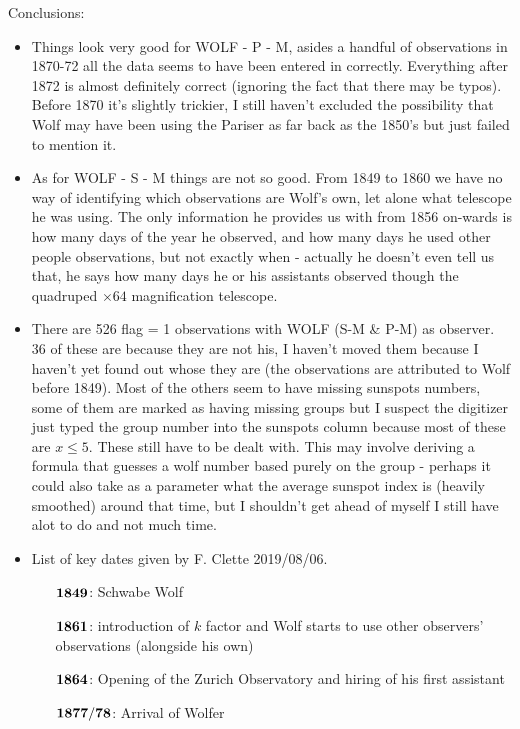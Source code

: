 \documentclass[12pt]{article}
\begin{document}
Conclusions:
\begin{itemize}
    \item Things look very good for WOLF - P - M, asides a handful of observations in 1870-72 all the data seems to have been entered in correctly. Everything after 1872 is almost definitely correct (ignoring the fact that there may be typos). Before 1870 it's slightly trickier, I still haven't excluded the possibility that Wolf may have been using the Pariser as far back as the 1850's but just failed to mention it. 
    \item As for WOLF - S - M things are not so good. From 1849 to 1860 we have no way of identifying which observations are Wolf's own, let alone what telescope he was using. The only information he provides us with from 1856 on-wards is how many days of the year he observed, and how many days he used other people observations, but not exactly when - actually he doesn't even tell us that, he says how many days he or his assistants observed though the quadruped $\times 64$ magnification telescope.
    \item There are 526 flag = 1 observations with WOLF (S-M \& P-M) as observer. 36 of these are because they are not his, I haven't moved them because I haven't yet found out whose they are (the observations are attributed to Wolf before 1849). Most of the others seem to have missing sunspots numbers, some of them are marked as having missing groups but I suspect the digitizer just typed the group number into the sunspots column because most of these are $x\leq 5$. These still have to be dealt with. This may involve deriving a formula that guesses a wolf number based purely on the group - perhaps it could also take as a parameter what the average sunspot index is (heavily smoothed) around that time, but I shouldn't get ahead of myself I still have alot to do and not much time.
       \item List of key dates given by F. Clette 2019/08/06.
    \begin{itemize}
        \item[$\bold{1849}$:] Schwabe Wolf
        \item[$\bold{1861}$:] introduction of $k$ factor and Wolf starts to use other observers' observations (alongside his own)
        \item[$\bold{1864}$:] Opening of the Zurich Observatory and hiring of his first assistant
        \item[$\bold{1877 / 78}$:] Arrival of Wolfer
    \end{itemize}

\end{itemize}
\end{document}
